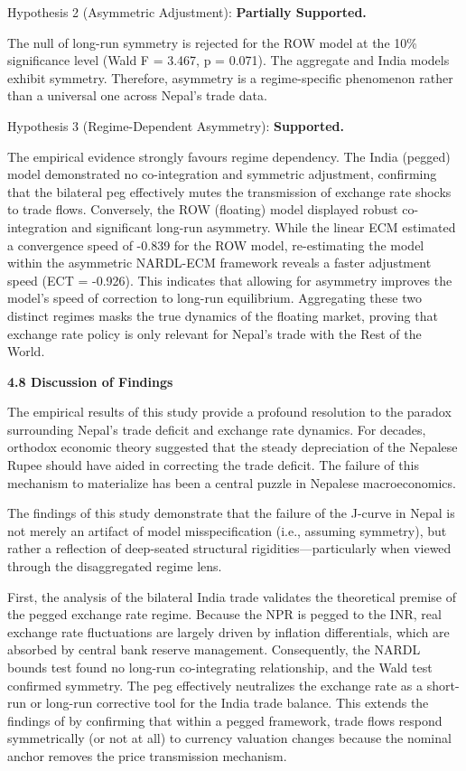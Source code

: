 \documentclass[12pt]{article}
\begin{document}
Hypothesis 2 (Asymmetric Adjustment): \textbf{Partially Supported.}

The null of long-run symmetry is rejected for the ROW model at the 10\% significance level (Wald F = 3.467, p = 0.071). The aggregate and India models exhibit symmetry. Therefore, asymmetry is a regime-specific phenomenon rather than a universal one across Nepal's trade data.

Hypothesis 3 (Regime-Dependent Asymmetry): \textbf{Supported.}

The empirical evidence strongly favours regime dependency. The India (pegged) model demonstrated no co-integration and symmetric adjustment, confirming that the bilateral peg effectively mutes the transmission of exchange rate shocks to trade flows. Conversely, the ROW (floating) model displayed robust co-integration and significant long-run asymmetry. While the linear ECM estimated a convergence speed of -0.839 for the ROW model, re-estimating the model within the asymmetric NARDL-ECM framework reveals a faster adjustment speed (ECT = -0.926). This indicates that allowing for asymmetry improves the model's speed of correction to long-run equilibrium. Aggregating these two distinct regimes masks the true dynamics of the floating market, proving that exchange rate policy is only relevant for Nepal's trade with the Rest of the World.

\vspace{0.5cm}
\noindent\textbf{4.8 Discussion of Findings}

The empirical results of this study provide a profound resolution to the paradox surrounding Nepal's trade deficit and exchange rate dynamics. For decades, orthodox economic theory suggested that the steady depreciation of the Nepalese Rupee should have aided in correcting the trade deficit. The failure of this mechanism to materialize has been a central puzzle in Nepalese macroeconomics.

The findings of this study demonstrate that the failure of the J-curve in Nepal is not merely an artifact of model misspecification (i.e., assuming symmetry), but rather a reflection of deep-seated structural rigidities—particularly when viewed through the disaggregated regime lens.

First, the analysis of the bilateral India trade validates the theoretical premise of the pegged exchange rate regime. Because the NPR is pegged to the INR, real exchange rate fluctuations are largely driven by inflation differentials, which are absorbed by central bank reserve management. Consequently, the NARDL bounds test found no long-run co-integrating relationship, and the Wald test confirmed symmetry. The peg effectively neutralizes the exchange rate as a short-run or long-run corrective tool for the India trade balance. This extends the findings of \textcite{Adhikari2020-rr} by confirming that within a pegged framework, trade flows respond symmetrically (or not at all) to currency valuation changes because the nominal anchor removes the price transmission mechanism.
\end{document}
